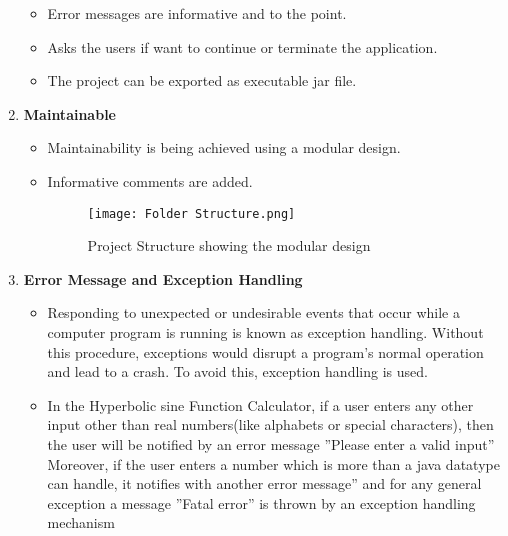 \documentclass{article}
\begin{document}
\begin{enumerate}
\begin{itemize}
\item Error messages are informative and to the point.
\item Asks the users if want to continue or terminate the application.
\item The project can be exported as executable jar file.
\end{itemize}
\item \textbf{Maintainable}
\begin{itemize}
\item Maintainability is being achieved using a modular design.
\item
Informative comments are added.
\begin{figure}[htp]
\centering
\texttt{[image: Folder Structure.png]}
\caption{Project Structure showing the modular design}
\label{Project Structure showing the modular design}
\end{figure}
\end{itemize}
\newpage
\item \textbf{Error Message and Exception Handling}
\begin{itemize}
\item
Responding to unexpected or undesirable events that occur while a computer program is running is known as exception handling. Without this procedure, exceptions would disrupt a program’s normal operation and lead to a crash. To avoid this, exception handling is used.
\item
In the Hyperbolic sine Function Calculator, if a user enters any other input other than real numbers(like alphabets or special characters), then
the user will be notified by an error message ”Please enter a valid input”
Moreover, if the user enters a number which is more than a java datatype can handle, it notifies with another error message” and for any general exception a message ”Fatal
error” is thrown by an exception handling mechanism
\end{itemize}
\newpage

\end{enumerate}
\end{document}
